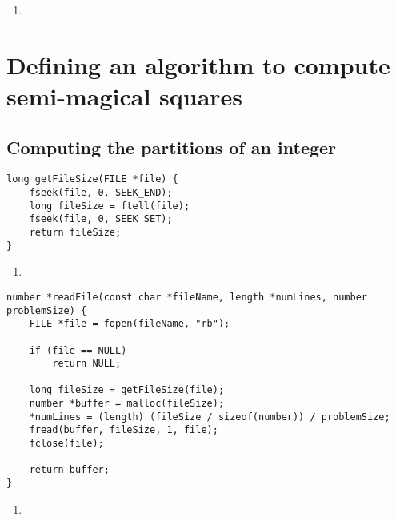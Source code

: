 \begin{enumerate}
\addtocounter{enumi}{1}
\item 
\end{enumerate}

\section{Defining an algorithm to compute semi-magical squares}

\subsection{Computing the partitions of an integer}

\begin{lstlisting}[caption={},label={getFileSize}]
long getFileSize(FILE *file) {
    fseek(file, 0, SEEK_END);
    long fileSize = ftell(file);
    fseek(file, 0, SEEK_SET);
    return fileSize;
}
\end{lstlisting}

\begin{enumerate}
\addtocounter{enumi}{1}
\item 
\end{enumerate}

\begin{lstlisting}[caption={},label={readFile}]
number *readFile(const char *fileName, length *numLines, number problemSize) {
    FILE *file = fopen(fileName, "rb");

    if (file == NULL)
        return NULL;

    long fileSize = getFileSize(file);
    number *buffer = malloc(fileSize);
    *numLines = (length) (fileSize / sizeof(number)) / problemSize;
    fread(buffer, fileSize, 1, file);
    fclose(file);

    return buffer;
}
\end{lstlisting}

\begin{enumerate}
\addtocounter{enumi}{1}
\item 
\end{enumerate}

